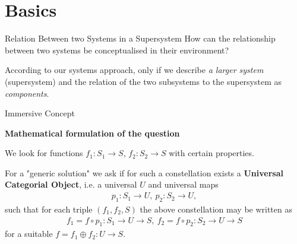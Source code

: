 \documentclass{beamer}
\title{Modelling Sustainable Systems\\ and Semantic Web\\[6pt]
  Immersive and Submersive System Theories
  \vskip1em}
\subtitle{Lecture in the Module 10-202-2309\\ for Master Computer Science}
\author{Prof. Dr. Hans-Gert Gräbe\\
\url{http://www.informatik.uni-leipzig.de/~graebe}}
\date{May 2021}
\newcommand{\ueberschrift}[1]{\begin{center}\bf #1\end{center}}
\begin{document}
{
\begin{frame}
  \titlepage
\end{frame}}

\section{Basics}
\begin{frame}{Relation Between two Systems in a Supersystem}
How can the relationship between two systems be conceptualised in their
environment?

According to our systems approach, only if we describe \emph{a larger system}
(supersystem) and the relation of the two subsystems to the supersystem as
\emph{components}.
\begin{center}  
\end{center}
\end{frame}
\begin{frame}{Immersive Concept}

\ueberschrift{Mathematical formulation of the question}
\small
We look for functions $f_1: S_1 \rightarrow S$, $f_2: S_2 \rightarrow S$ with
certain properties.

For a "generic solution" we ask if for such a constellation exists a
\textbf{Universal Categorial Object}, i.e. a universal $U$ and universal maps
\begin{gather*}
  p_1: S_1 \rightarrow U,\ p_2: S_2 \rightarrow U,
\end{gather*}
such that for each triple $(f_1, f_2, S)$ the above constellation may be
written as
\begin{gather*}
  f_1 = f \circ p_1: S_1 \rightarrow U \rightarrow S,\ f_2 = f \circ p_2 : S_2
  \rightarrow U \rightarrow S
\end{gather*}
for a suitable $f = f_1 \oplus f_2: U \rightarrow S$.

\end{frame}
\end{document}
